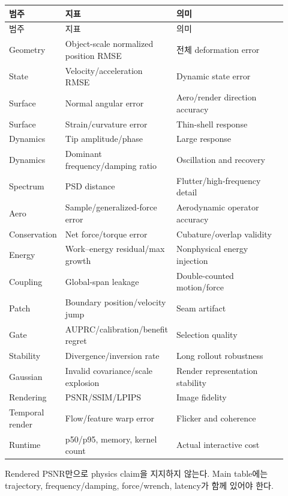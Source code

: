 \documentclass[11pt,a4paper]{article}
\begin{document}
\begin{longtable}{L{0.20\linewidth}L{0.31\linewidth}L{0.41\linewidth}}
\toprule
범주 & 지표 & 의미 \\
\midrule
\endfirsthead
\toprule
범주 & 지표 & 의미 \\
\midrule
\endhead
Geometry & Object-scale normalized position RMSE & 전체 deformation error \\
\addlinespace
State & Velocity/acceleration RMSE & Dynamic state error \\
\addlinespace
Surface & Normal angular error & Aero/render direction accuracy \\
\addlinespace
Surface & Strain/curvature error & Thin-shell response \\
\addlinespace
Dynamics & Tip amplitude/phase & Large response \\
\addlinespace
Dynamics & Dominant frequency/damping ratio & Oscillation and recovery \\
\addlinespace
Spectrum & PSD distance & Flutter/high-frequency detail \\
\addlinespace
Aero & Sample/generalized-force error & Aerodynamic operator accuracy \\
\addlinespace
Conservation & Net force/torque error & Cubature/overlap validity \\
\addlinespace
Energy & Work--energy residual/max growth & Nonphysical energy injection \\
\addlinespace
Coupling & Global-span leakage & Double-counted motion/force \\
\addlinespace
Patch & Boundary position/velocity jump & Seam artifact \\
\addlinespace
Gate & AUPRC/calibration/benefit regret & Selection quality \\
\addlinespace
Stability & Divergence/inversion rate & Long rollout robustness \\
\addlinespace
Gaussian & Invalid covariance/scale explosion & Render representation stability \\
\addlinespace
Rendering & PSNR/SSIM/LPIPS & Image fidelity \\
\addlinespace
Temporal render & Flow/feature warp error & Flicker and coherence \\
\addlinespace
Runtime & p50/p95, memory, kernel count & Actual interactive cost \\
\bottomrule
\end{longtable}

Rendered PSNR만으로 physics claim을 지지하지 않는다.
Main table에는 trajectory, frequency/damping, force/wrench, latency가 함께 있어야 한다.
\end{document}
